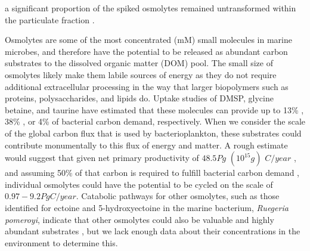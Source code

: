 \documentclass[utf8]{frontiersSCNS} %
\begin{document}
a significant proportion of the spiked osmolytes remained untransformed within the particulate fraction \citep{Kiene1998,Motard-Cote2015}.

Osmolytes are some of the most concentrated (mM) small molecules in marine microbes, and therefore have the potential to be released as abundant carbon substrates to the dissolved organic matter (DOM) pool. The small size of osmolytes likely make them labile sources of energy as they do not require additional extracellular processing in the way that larger biopolymers such as proteins, polysaccharides, and lipids do. Uptake studies of DMSP, glycine betaine, and taurine have estimated that these molecules can provide up to 13\% \citep{Kiene2000}, 38\% \citep{Kiene1998}, or 4\% \citep{Clifford2020} of bacterial carbon demand, respectively. When we consider the scale of the global carbon flux that is used by bacterioplankton, these substrates could contribute monumentally to this flux of energy and matter. A rough estimate would suggest that given net primary productivity of $48.5 Pg$ $(10^{15} g)$ $C / year$ \citep{Field1998}, and assuming 50\% of that carbon is required to fulfill bacterial carbon demand \citep{Ducklow2000}, individual osmolytes could have the potential to be cycled on the scale of $0.97 - 9.2 Pg  C / year$. Catabolic pathways for other osmolytes, such as those identified for ectoine and 5-hydroxyectoine in the marine bacterium, \emph{Ruegeria pomeroyi}, indicate that other osmolytes could also be valuable and highly abundant substrates \citep{Schulz2017}, but we lack enough data about their concentrations in the environment to determine this.
\end{document}
